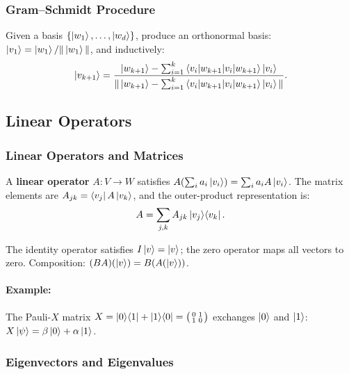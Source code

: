 \documentclass[10pt,a4paper]{article}
\begin{document}
\subsubsection*{Gram--Schmidt Procedure}

\begin{tcolorbox}[defstyle, title={Definition: Gram--Schmidt Procedure}]
Given a basis $\{\ket{w_1},\dots,\ket{w_d}\}$, produce an orthonormal basis: $\ket{v_1}=\ket{w_1}/\|\ket{w_1}\|$, and inductively:
\[
\ket{v_{k+1}} = \frac{\ket{w_{k+1}} - \sum_{i=1}^{k}\braket{v_i|w_{k+1}}\ket{v_i}}{\|\ket{w_{k+1}} - \sum_{i=1}^{k}\braket{v_i|w_{k+1}}\ket{v_i}\|}.
\]
\end{tcolorbox}

\subsection{Linear Operators}

\subsubsection*{Linear Operators and Matrices}

\begin{tcolorbox}[defstyle, title={Definition: Linear Operator}]
A \textbf{linear operator} $A:V\to W$ satisfies $A(\sum_i a_i\ket{v_i})=\sum_i a_i A\ket{v_i}$. The matrix elements are $A_{jk}=\bra{v_j}A\ket{v_k}$, and the outer-product representation is:
\[
A = \sum_{j,k} A_{jk}\ket{v_j}\!\bra{v_k}.
\]
\end{tcolorbox}

The identity operator satisfies $I\ket{v}=\ket{v}$; the zero operator maps all vectors to zero. Composition: $(BA)(\ket{v})=B(A(\ket{v}))$.

\paragraph{Example:} The Pauli-$X$ matrix $X=\ket{0}\!\bra{1}+\ket{1}\!\bra{0}=\bigl(\begin{smallmatrix}0&1\\1&0\end{smallmatrix}\bigr)$ exchanges $\ket{0}$ and $\ket{1}$: $X\ket{\psi}=\beta\ket{0}+\alpha\ket{1}$.

\subsubsection*{Eigenvectors and Eigenvalues}
\end{document}
